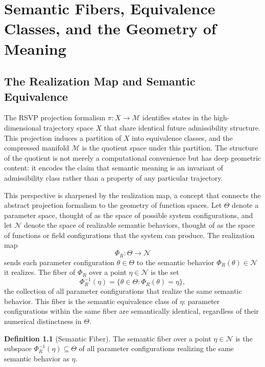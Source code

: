 \documentclass[12pt, a4paper, openany]{book}
\theoremstyle{plain}
\theoremstyle{definition}
\newtheorem{definition}[theorem]{Definition}
\theoremstyle{remark}
\begin{document}
\chapter{Semantic Fibers, Equivalence Classes, and the Geometry of Meaning}

\section{The Realization Map and Semantic Equivalence}

The RSVP projection formalism $\pi: X \to \mathcal{M}$ identifies states in the high-dimensional trajectory space $X$ that share identical future admissibility structure. This projection induces a partition of $X$ into equivalence classes, and the compressed manifold $\mathcal{M}$ is the quotient space under this partition. The structure of the quotient is not merely a computational convenience but has deep geometric content: it encodes the claim that semantic meaning is an invariant of admissibility class rather than a property of any particular trajectory.

This perspective is sharpened by the realization map, a concept that connects the abstract projection formalism to the geometry of function spaces. Let $\Theta$ denote a parameter space, thought of as the space of possible system configurations, and let $\mathcal{N}$ denote the space of realizable semantic behaviors, thought of as the space of functions or field configurations that the system can produce. The realization map
\[
\Phi_R : \Theta \to \mathcal{N}
\]
sends each parameter configuration $\theta \in \Theta$ to the semantic behavior $\Phi_R(\theta) \in \mathcal{N}$ it realizes. The fiber of $\Phi_R$ over a point $\eta \in \mathcal{N}$ is the set
\[
\Phi_R^{-1}(\eta) = \{\theta \in \Theta : \Phi_R(\theta) = \eta\},
\]
the collection of all parameter configurations that realize the same semantic behavior. This fiber is the semantic equivalence class of $\eta$: parameter configurations within the same fiber are semantically identical, regardless of their numerical distinctness in $\Theta$.

\begin{definition}[Semantic Fiber]
The semantic fiber over a point $\eta \in \mathcal{N}$ is the subspace $\Phi_R^{-1}(\eta) \subseteq \Theta$ of all parameter configurations realizing the same semantic behavior as $\eta$.
\end{definition}
\end{document}
